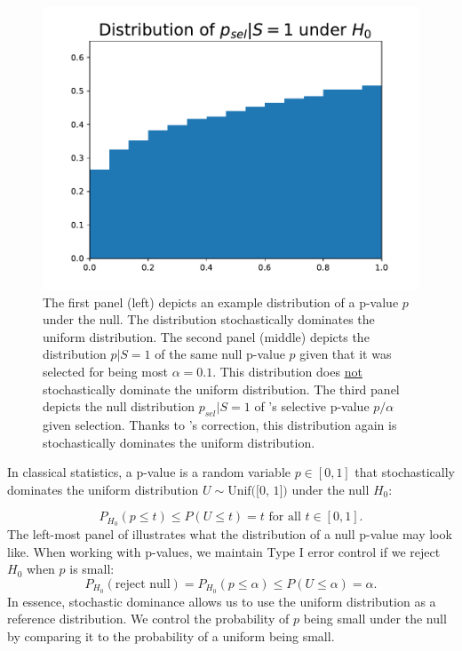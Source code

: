 \documentclass{article}
\begin{document}
\begin{figure}[]
{\begin{minipage}{0.33\textwidth}
        \centering
        \includegraphics[width=\textwidth]{p_sel_dist_given.pdf}
    \end{minipage}
    }
    \caption{The first panel (left) depicts an example distribution of a p-value $p$ under the null. The distribution stochastically dominates the uniform distribution. The second panel (middle) depicts the distribution $p | S = 1$ of the same null p-value $p$ given that it was selected for being most $\alpha=0.1$. This distribution does \underline{not} stochastically dominate the uniform distribution. The third panel depicts the null distribution $p_{sel}|S=1$ of 's selective p-value $p/\alpha$ given selection. Thanks to 's correction, this distribution again is stochastically dominates  the uniform distribution.}
    \label{fig:distributions}
\end{figure}

In classical statistics, a p-value is a random variable $p \in [0, 1]$ that stochastically dominates the uniform distribution $U \sim \text{Unif([0, 1])}$ under the null $H_0$:

\begin{equation*}
    P_{H_0}(p \leq t) \leq P(U \leq t)= t \text{ for all } t \in [0, 1].
\end{equation*}
The left-most panel of  illustrates what the distribution of a null p-value may look like. When working with p-values, we maintain Type I error control if we reject $H_0$ when $p$ is small:
\begin{equation*}
    P_{H_0}(\text{reject null}) = P_{H_0}(p \leq \alpha) \leq P(U \leq \alpha)  = \alpha.
\end{equation*}
In essence, stochastic dominance allows us to use the uniform distribution as a reference distribution. We control the probability of $p$ being small under the null by comparing it to the probability of a uniform being small. 
\end{document}
